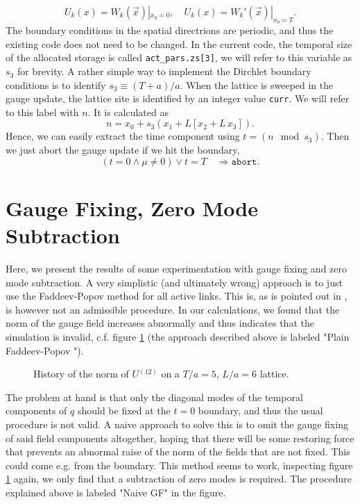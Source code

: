 \documentclass[a4paper]{scrartcl}
\newcommand{\ord}[1]{\ensuremath{^{(#1)}}}
\begin{document}
\begin{equation}
  \label{eq:15}
  U_k(x) = W_k(\vec x)|_{x_0 = 0}, \quad  U_k(x) = W_k'(\vec x)|_{x_0 = T}.
\end{equation}
%
The boundary conditions in the spatial directrions are periodic, and
thus the existing code does not need to be changed. In the current
code, the temporal size of the allocated storage is called
\texttt{act\_pars.zs[3]}, we will refer to this variable as $s_3$ for
brevity. A rather simple way to implement the Dirchlet boundary
conditions is to identify $s_3 \equiv (T + a)/a$. When the lattice is
sweeped in the gauge update, the lattice site is identified by an
integer value \texttt{curr}. We will refer to this label with $n$. It
is calculated as
%
\begin{equation}
  \label{eq:16}
  n = x_0 + s_3 ( x_1 + L [ x_2 + L\, x_3] ).
\end{equation}
%
Hence, we can easily extract the time component using $t = (n \mod
s_3)$. Then we just abort the gauge update if we hit the boundary,
%
\begin{equation}
  \label{eq:17}
  (t = 0 \land \mu \neq 0) \lor t = T\quad \Rightarrow
  \mathtt{abort}.
\end{equation}

\section{Gauge Fixing, Zero Mode Subtraction}
\label{sec:gauge-fixing}

Here, we present the results of some experimentation with gauge fixing
and zero mode subtraction. A very simplistic (and ultimately wrong)
approach is to just use the Faddeev-Popov method for all active
links. This is, as is pointed out in \cite{Luscher:1992an}, is however
not an admissible procedure. In our calculations, we found that the
norm of the gauge field increases abnormally and thus indicates that
the simulation is invalid, c.f. figure \ref{fig:norm} (the approach
described above is labeled "Plain Faddeev-Popov ").

\begin{figure}
  \centering
    
  \caption{History of the norm of $U\ord {12}$ on
    a $T/a = 5$, $L/a = 6$ lattice.}
  \label{fig:norm}
\end{figure}

The problem at hand is that only the diagonal modes of the temporal
components of $q$ should be fixed at the $t=0$ boundary, and thus the
usual procedure is not valid. A naive approach to solve this is to
omit the gauge fixing of said field components altogether, hoping that
there will be some restoring force that prevents an abnormal raise of
the norm of the fields that are not fixed. This could come e.g. from
the boundary. This method seems to work, inspecting figure
\ref{fig:norm} again, we only find that a subtraction of zero modes is
required. The procedure explained above is labeled "Naive GF" in the
figure.
\end{document}
